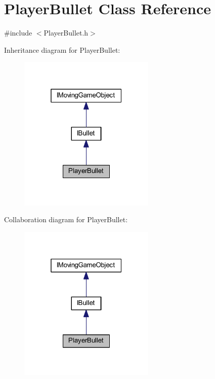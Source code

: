 \hypertarget{class_player_bullet}{}\section{Player\+Bullet Class Reference}
\label{class_player_bullet}


{\ttfamily \#include $<$Player\+Bullet.\+h$>$}



Inheritance diagram for Player\+Bullet\+:\nopagebreak
\begin{figure}[H]
\begin{center}
\leavevmode
\includegraphics[width=184pt]{class_player_bullet__inherit__graph}
\end{center}
\end{figure}


Collaboration diagram for Player\+Bullet\+:\nopagebreak
\begin{figure}[H]
\begin{center}
\leavevmode
\includegraphics[width=184pt]{class_player_bullet__coll__graph}
\end{center}
\end{figure}
